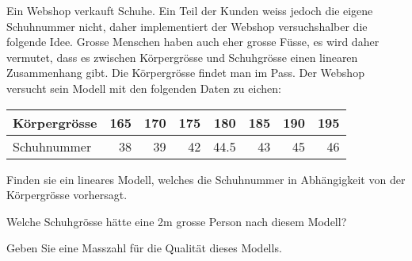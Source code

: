 Ein Webshop verkauft Schuhe.
Ein Teil der Kunden weiss jedoch die eigene Schuhnummer nicht, 
daher implementiert der Webshop versuchshalber die folgende Idee.
Grosse Menschen haben auch eher grosse Füsse, es wird daher vermutet,
dass es zwischen Körpergrösse und Schuhgrösse einen linearen
Zusammenhang gibt. 
Die Körpergrösse findet man im Pass.
Der Webshop versucht sein Modell mit den folgenden Daten zu
eichen:
\begin{center}
\begin{tabular}{lrrrrrrr}
Körpergrösse&165&170&175&180  &185&190&195\\
\hline
Schuhnummer   & 38& 39& 42& 44.5& 43& 45&46
\end{tabular}
\end{center}
\begin{teilaufgaben}
\item Finden sie ein lineares Modell, welches die Schuhnummer in
Abhängigkeit von der Körpergrösse vorhersagt.
\item Welche Schuhgrösse hätte eine 2m grosse Person nach diesem Modell?
\item Geben Sie eine Masszahl für die Qualität dieses Modells.
\end{teilaufgaben}


